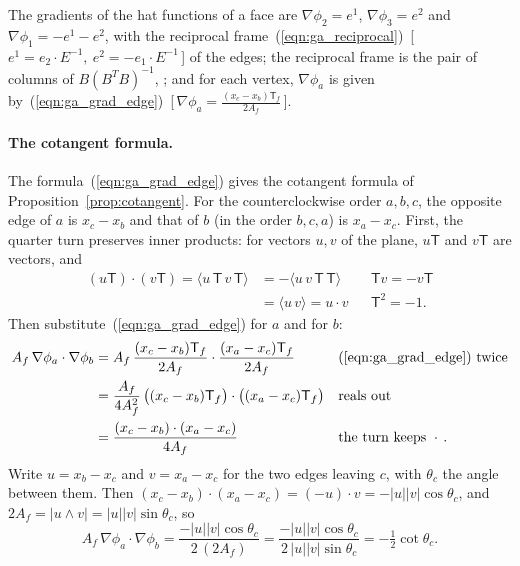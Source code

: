 \begin{prop}
\label{prop:ga_reciprocal}
The gradients of the hat functions of a face are $\nabla \phi_2 = e^1$, $\nabla \phi_3 = e^2$ and $\nabla \phi_1 = -e^1 - e^2$, with the reciprocal frame~(\ref{eqn:ga_reciprocal})~[\,$e^1 = e_2\cdot E^{-1},\ e^2 = -e_1\cdot E^{-1}$\,] of the edges; the reciprocal frame is the pair of columns of $B (B^T B)^{-1}$, ; and for each vertex, $\nabla\phi_a$ is given by~(\ref{eqn:ga_grad_edge})~[\,$\nabla\phi_a = \frac{(x_c - x_b)\mathsf T_f}{2A_f}$\,].
\end{prop}

\paragraph{The cotangent formula.} The formula~(\ref{eqn:ga_grad_edge}) gives the cotangent formula of Proposition~\ref{prop:cotangent}. For the counterclockwise order $a, b, c$, the opposite edge of $a$ is $x_c - x_b$ and that of $b$ (in the order $b, c, a$) is $x_a - x_c$. First, the quarter turn preserves inner products: for vectors $u, v$ of the plane, $u\mathsf T$ and $v\mathsf T$ are vectors, and
\begin{align*}
(u\mathsf T)\cdot(v\mathsf T) = \langle u\,\mathsf T\, v\,\mathsf T\rangle &= -\langle u\, v\,\mathsf T\,\mathsf T\rangle && \mathsf T v = -v\mathsf T \\
&= \langle u\, v\rangle = u\cdot v && \mathsf T^2 = -1 .
\end{align*}
Then substitute~(\ref{eqn:ga_grad_edge}) for $a$ and for $b$:
\begin{align*}
A_f\, \nabla\phi_a \cdot \nabla\phi_b &= A_f\, \frac{(x_c - x_b)\mathsf T_f}{2A_f} \cdot \frac{(x_a - x_c)\mathsf T_f}{2A_f} && \text{(\ref{eqn:ga_grad_edge}) twice} \\
&= \frac{A_f}{4A_f^2}\,\big((x_c - x_b)\mathsf T_f\big)\cdot\big((x_a - x_c)\mathsf T_f\big) && \text{reals out} \\
&= \frac{(x_c - x_b) \cdot (x_a - x_c)}{4 A_f} && \text{the turn keeps } \cdot\, .
\end{align*}
Write $u = x_b - x_c$ and $v = x_a - x_c$ for the two edges leaving $c$, with $\theta_c$ the angle between them. Then $(x_c - x_b)\cdot(x_a - x_c) = (-u)\cdot v = -|u||v|\cos\theta_c$, and $2A_f = |u \wedge v| = |u||v|\sin\theta_c$, so
\begin{equation*}
A_f\, \nabla\phi_a \cdot \nabla\phi_b = \frac{-|u||v|\cos\theta_c}{2\,(2A_f)} = \frac{-|u||v|\cos\theta_c}{2\,|u||v|\sin\theta_c} = -\tfrac12\cot\theta_c .
\end{equation*}

